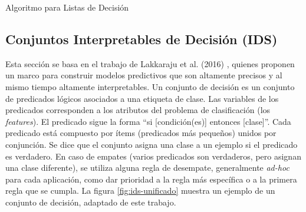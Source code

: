 \begin{algorithm}[H]
\caption{Algoritmo para Listas de Decisión}

\end{algorithm}

\subsection{Conjuntos Interpretables de Decisión (IDS)}

Esta sección se basa en el trabajo de Lakkaraju et al. (2016) \cite{lakkaraju-2016}, quienes proponen un marco para construir modelos predictivos que son altamente precisos y al mismo tiempo altamente interpretables. Un conjunto de decisión es un conjunto de predicados lógicos asociados a una etiqueta de clase. Las variables de los predicados corresponden a los atributos del problema de clasificación (los \emph{features}). El predicado sigue la forma “si [condición(es)] entonces [clase]”. Cada predicado está compuesto por ítems (predicados más pequeños) unidos por conjunción. Se dice que el conjunto asigna una clase a un ejemplo si el predicado es verdadero. En caso de empates (varios predicados son verdaderos, pero asignan una clase diferente), se utiliza alguna regla de desempate, generalmente \emph{ad-hoc} para cada aplicación, como dar prioridad a la regla más específica o a la primera regla que se cumpla. La figura \ref{fig:ids-unificado} muestra un ejemplo de un conjunto de decisión, adaptado de este trabajo. 

